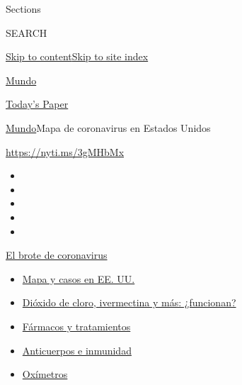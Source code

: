 Sections

SEARCH

\protect\hyperlink{site-content}{Skip to
content}\protect\hyperlink{site-index}{Skip to site index}

\href{https://www.nytimes.com/es/section/mundo}{Mundo}

\href{https://myaccount.nytimes.com/auth/login?response_type=cookie\&client_id=vi}{}

\href{https://www.nytimes.com/section/todayspaper}{Today's Paper}

\href{/es/section/mundo}{Mundo}\textbar{}Mapa de coronavirus en Estados
Unidos

\url{https://nyti.ms/3gMHbMx}

\begin{itemize}
\item
\item
\item
\item
\item
\end{itemize}

\href{https://www.nytimes.com/es/spotlight/coronavirus?action=click\&pgtype=Article\&state=default\&region=TOP_BANNER\&context=storylines_menu}{El
brote de coronavirus}

\begin{itemize}
\tightlist
\item
  \href{https://www.nytimes.com/es/interactive/2020/espanol/mundo/coronavirus-en-estados-unidos.html?action=click\&pgtype=Article\&state=default\&region=TOP_BANNER\&context=storylines_menu}{Mapa
  y casos en EE. UU.}
\item
  \href{https://www.nytimes.com/es/2020/07/23/espanol/america-latina/bolivia-cloro-coronavirus-ivermectina.html?action=click\&pgtype=Article\&state=default\&region=TOP_BANNER\&context=storylines_menu}{Dióxido
  de cloro, ivermectina y más: ¿funcionan?}
\item
  \href{https://www.nytimes.com/es/interactive/2020/science/coronavirus-tratamientos-curas.html?action=click\&pgtype=Article\&state=default\&region=TOP_BANNER\&context=storylines_menu}{Fármacos
  y tratamientos}
\item
  \href{https://www.nytimes.com/es/2020/07/28/espanol/ciencia-y-tecnologia/anticuerpos-coronavirus-inmunidad.html?action=click\&pgtype=Article\&state=default\&region=TOP_BANNER\&context=storylines_menu}{Anticuerpos
  e inmunidad}
\item
  \href{https://www.nytimes.com/es/2020/04/29/espanol/estilos-de-vida/oximetro-para-que-sirve.html?action=click\&pgtype=Article\&state=default\&region=TOP_BANNER\&context=storylines_menu}{Oxímetros}
\end{itemize}

